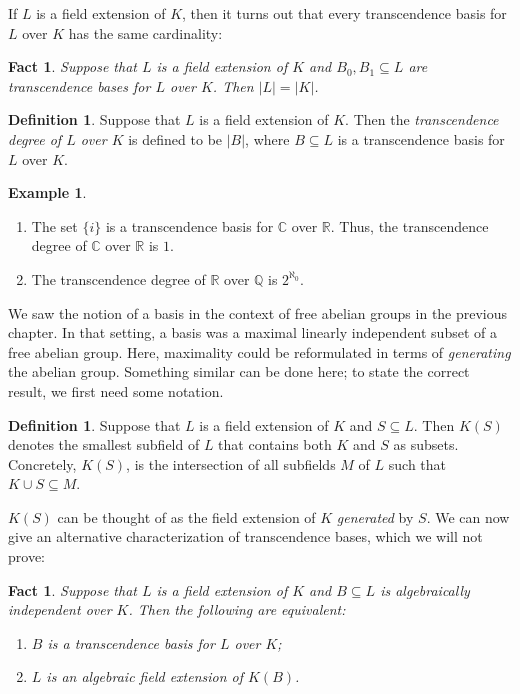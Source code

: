\documentclass[a4paper]{memoir}
\newtheorem{fact}[theorem]{Fact}
\theoremstyle{definition}
\newtheorem{definition}[theorem]{Definition}
\newtheorem{example}[theorem]{Example}
\newcommand{\bb}{\mathbb}
\begin{document}
If $L$ is a field extension of $K$, then it turns out that every transcendence basis for 
$L$ over $K$ has the same cardinality:

\begin{fact}
  Suppose that $L$ is a field extension of $K$ and $B_0, B_1 \subseteq L$ are transcendence 
  bases for $L$ over $K$. Then $|L| = |K|$.
\end{fact}

\begin{definition}
  Suppose that $L$ is a field extension of $K$. Then the \emph{transcendence degree of $L$ 
  over $K$} is defined to be $|B|$, where $B \subseteq L$ is a transcendence basis for $L$ 
  over $K$.
\end{definition}

\begin{example}
  \begin{enumerate}
    \item The set $\{i\}$ is a transcendence basis for $\bb{C}$ over $\bb{R}$. Thus, the 
    transcendence degree of $\bb{C}$ over $\bb{R}$ is $1$.
    \item The transcendence degree of $\bb{R}$ over $\bb{Q}$ is $2^{\aleph_0}$.
  \end{enumerate}
\end{example}

We saw the notion of a basis in the context of free abelian groups in the previous chapter. 
In that setting, a basis was a maximal linearly independent subset of a free abelian group. 
Here, maximality could be reformulated in terms of \emph{generating} the abelian group. 
Something similar can be done here; to state the correct result, we first need some notation.

\begin{definition}
  Suppose that $L$ is a field extension of $K$ and $S \subseteq L$. Then $K(S)$ denotes the 
  smallest subfield of $L$ that contains both $K$ and $S$ as subsets. Concretely, 
  $K(S)$, is the intersection of all subfields $M$ of $L$ such that $K \cup S \subseteq M$.
\end{definition}

$K(S)$ can be thought of as the field extension of $K$ \emph{generated} by $S$. We can 
now give an alternative characterization of transcendence bases, which we will not prove:

\begin{fact} \label{fact: transcendence_basis}
  Suppose that $L$ is a field extension of $K$ and $B \subseteq L$ is algebraically 
  independent over $K$. Then the following are equivalent:
  \begin{enumerate}
    \item $B$ is a transcendence basis for $L$ over $K$;
    \item $L$ is an algebraic field extension of $K(B)$.
  \end{enumerate}
\end{fact}
\end{document}
